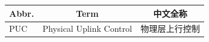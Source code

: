 
\begin{longtable}{|p{}|p{}|p{}|}
  \hline
  \multicolumn{1}{|c|}{Abbr.} & \multicolumn{1}{c|}{Term} & \multicolumn{1}{c|}{中文全称} \\ \hline
  PUC & Physical Uplink Control & 物理层上行控制 \\ \hline  

\end{longtable}
